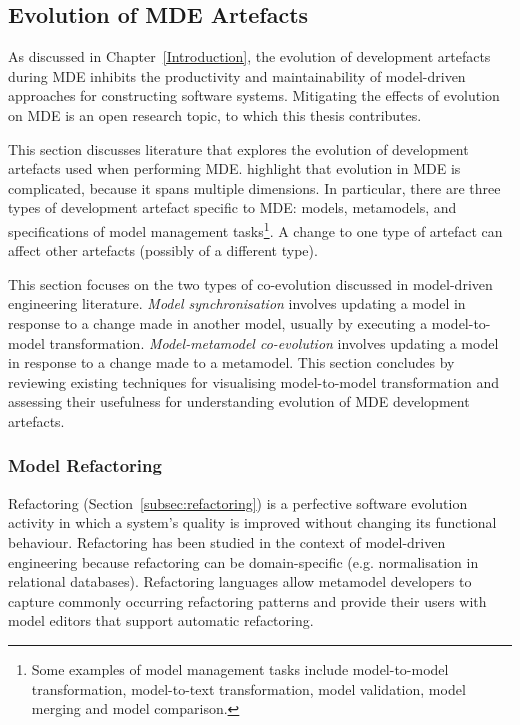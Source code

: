 \subsection{Evolution of MDE Artefacts}
\label{LitReview:SoftwareEvo:MdeEvo}
As discussed in Chapter~\ref{Introduction}, the evolution of development artefacts during MDE inhibits the productivity and maintainability of model-driven approaches for constructing software systems. Mitigating the effects of evolution on MDE is an open research topic, to which this thesis contributes.

This section discusses literature that explores the evolution of development artefacts used when performing MDE. \cite{deursen07mdse} highlight that evolution in MDE is complicated, because it spans multiple dimensions. In particular, there are three types of development artefact specific to MDE: models, metamodels, and specifications of model management tasks\footnote{Some examples of model management tasks include model-to-model transformation, model-to-text transformation, model validation, model merging and model comparison.}. A change to one type of artefact can affect other artefacts (possibly of a different type). 

This section focuses on the two types of co-evolution discussed in model-driven engineering literature. \emph{Model synchronisation} involves updating a model in response to a change made in another model, usually by executing a model-to-model transformation. \emph{Model-metamodel co-evolution} involves updating a model in response to a change made to a metamodel. This section concludes by reviewing existing techniques for visualising model-to-model transformation and assessing their usefulness for understanding evolution of MDE development artefacts. 

\subsubsection{Model Refactoring}
Refactoring (Section~\ref{subsec:refactoring}) is a perfective software evolution activity in which a system's quality is improved without changing its functional behaviour.  Refactoring has been studied in the context of model-driven engineering because refactoring can be domain-specific (e.g. normalisation in relational databases). Refactoring languages allow metamodel developers to capture commonly occurring refactoring patterns and provide their users with model editors that support automatic refactoring. 

